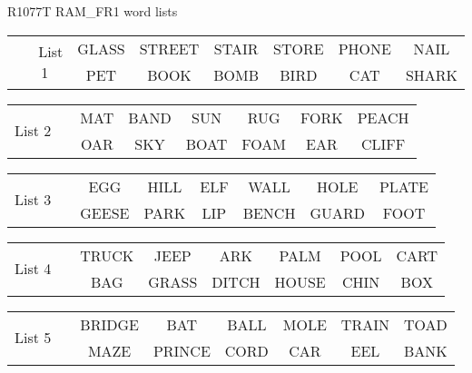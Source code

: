 \documentclass{article}
\begin{document}
\begin{center}
{\large R1077T RAM\_FR1 word lists}
\end{center}

\vspace{.1in}
\hspace{.5in}\begin{tabular}{r||c c c c c c }
\multirow{2}{*}{List 1~~} & GLASS & STREET & STAIR & STORE & PHONE & NAIL\\
\cline{2-7}			& PET & BOOK & BOMB & BIRD & CAT & SHARK\\
\end{tabular}

\vspace{.1in}
\hspace{.5in}\begin{tabular}{r||c c c c c c }
\multirow{2}{*}{List 2~~} & MAT & BAND & SUN & RUG & FORK & PEACH\\
\cline{2-7}			& OAR & SKY & BOAT & FOAM & EAR & CLIFF\\
\end{tabular}

\vspace{.1in}
\hspace{.5in}\begin{tabular}{r||c c c c c c }
\multirow{2}{*}{List 3~~} & EGG & HILL & ELF & WALL & HOLE & PLATE\\
\cline{2-7}			& GEESE & PARK & LIP & BENCH & GUARD & FOOT\\
\end{tabular}

\vspace{.1in}
\hspace{.5in}\begin{tabular}{r||c c c c c c }
\multirow{2}{*}{List 4~~} & TRUCK & JEEP & ARK & PALM & POOL & CART\\
\cline{2-7}			& BAG & GRASS & DITCH & HOUSE & CHIN & BOX\\
\end{tabular}

\vspace{.1in}
\hspace{.5in}\begin{tabular}{r||c c c c c c }
\multirow{2}{*}{List 5~~} & BRIDGE & BAT & BALL & MOLE & TRAIN & TOAD\\
\cline{2-7}			& MAZE & PRINCE & CORD & CAR & EEL & BANK\\
\end{tabular}
\end{document}
